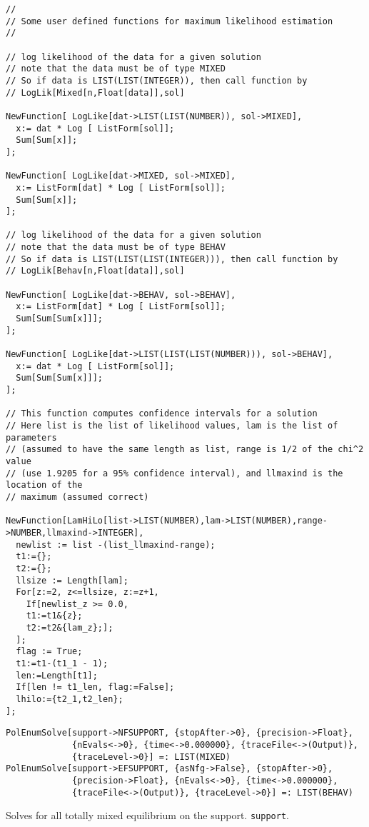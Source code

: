 {\scriptsize
\begin{verbatim}
//
// Some user defined functions for maximum likelihood estimation
// 

// log likelihood of the data for a given solution
// note that the data must be of type MIXED
// So if data is LIST(LIST(INTEGER)), then call function by  
// LogLik[Mixed[n,Float[data]],sol]

NewFunction[ LogLike[dat->LIST(LIST(NUMBER)), sol->MIXED], 
  x:= dat * Log [ ListForm[sol]];
  Sum[Sum[x]];
];

NewFunction[ LogLike[dat->MIXED, sol->MIXED], 
  x:= ListForm[dat] * Log [ ListForm[sol]];
  Sum[Sum[x]];
];

// log likelihood of the data for a given solution
// note that the data must be of type BEHAV
// So if data is LIST(LIST(LIST(INTEGER))), then call function by  
// LogLik[Behav[n,Float[data]],sol]

NewFunction[ LogLike[dat->BEHAV, sol->BEHAV], 
  x:= ListForm[dat] * Log [ ListForm[sol]];
  Sum[Sum[Sum[x]]];
];

NewFunction[ LogLike[dat->LIST(LIST(LIST(NUMBER))), sol->BEHAV], 
  x:= dat * Log [ ListForm[sol]];
  Sum[Sum[Sum[x]]];
];

// This function computes confidence intervals for a solution
// Here list is the list of likelihood values, lam is the list of parameters
// (assumed to have the same length as list, range is 1/2 of the chi^2 value
// (use 1.9205 for a 95% confidence interval), and llmaxind is the location of the 
// maximum (assumed correct) 

NewFunction[LamHiLo[list->LIST(NUMBER),lam->LIST(NUMBER),range->NUMBER,llmaxind->INTEGER],
  newlist := list -(list_llmaxind-range);
  t1:={};
  t2:={};
  llsize := Length[lam];
  For[z:=2, z<=llsize, z:=z+1,
    If[newlist_z >= 0.0, 
    t1:=t1&{z}; 
    t2:=t2&{lam_z};];
  ];
  flag := True;
  t1:=t1-(t1_1 - 1);
  len:=Length[t1];
  If[len != t1_len, flag:=False];
  lhilo:={t2_1,t2_len};
];
\end{verbatim}
}







\item{} 
\protect \large \begin{verbatim}
PolEnumSolve[support->NFSUPPORT, {stopAfter->0}, {precision->Float}, 
             {nEvals<->0}, {time<->0.000000}, {traceFile<->(Output)}, 
             {traceLevel->0}] =: LIST(MIXED) 
PolEnumSolve[support->EFSUPPORT, {asNfg->False}, {stopAfter->0}, 
             {precision->Float}, {nEvals<->0}, {time<->0.000000}, 
             {traceFile<->(Output)}, {traceLevel->0}] =: LIST(BEHAV) 
\end{verbatim} \normalsize
\bd 
Solves for all totally mixed equilibrium on the support.  
\verb+support+.  

